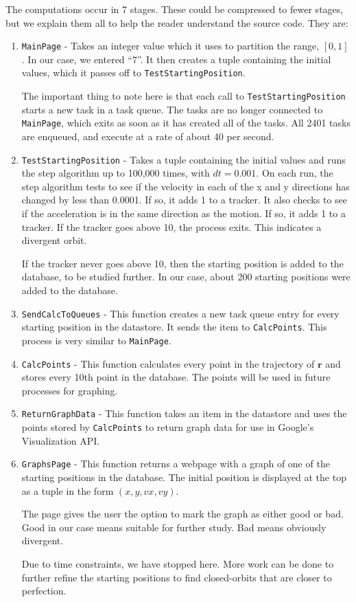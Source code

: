 \documentclass[11pt]{article}
\begin{document}
The computations occur in 7 stages. These could be compressed to fewer stages, but we explain them all to help the reader understand the source code. They are:
\begin{enumerate}
\item \texttt{MainPage} - Takes an integer value which it uses to partition the range, $[0,1]$. In our case, we entered ``7''. It then creates a tuple containing the initial values, which it passes off to \texttt{TestStartingPosition}.

The important thing to note here is that each call to \texttt{TestStartingPosition} starts a new task in a task queue. The tasks are no longer connected to \texttt{MainPage}, which exits as soon as it has created all of the tasks. All 2401 tasks are enqueued, and execute at a rate of about 40 per second. 
\item \texttt{TestStartingPosition} - Takes a tuple containing the initial values and runs the step algorithm up to 100,000 times, with $dt = 0.001$. On each run, the step algorithm tests to see if the velocity in each of the x and y directions has changed by less than 0.0001. If so, it adds 1 to a tracker. It also checks to see if the acceleration is in the same direction as the motion. If so, it adds 1 to a tracker. If the tracker goes above 10, the process exits. This indicates a divergent orbit. 

If the tracker never goes above 10, then the starting position is added to the database, to be studied further. In our case, about 200 starting positions were added to the database.

\item \texttt{SendCalcToQueues} - This function creates a new task queue entry for every starting position in the datastore. It sends the item to \texttt{CalcPoints}. This process is very similar to \texttt{MainPage}.

\item \texttt{CalcPoints} - This function calculates every point in the trajectory of $\mathbf{r}$ and stores every 10th point in the database. The points will be used in future processes for graphing.

\item \texttt{ReturnGraphData} - This function takes an item in the datastore and uses the points stored by \texttt{CalcPoints} to return graph data for use in Google's Visualization API.

\item \texttt{GraphsPage} - This function returns a webpage with a graph of one of the starting positions in the database. The initial position is displayed at the top as a tuple in the form $(x,y,vx,vy)$. 

The page gives the user the option to mark the graph as either good or bad. Good in our case means suitable for further study. Bad means obviously divergent.

Due to time constraints, we have stopped here. More work can be done to further refine the starting positions to find closed-orbits that are closer to perfection.
\end{enumerate}
\end{document}
